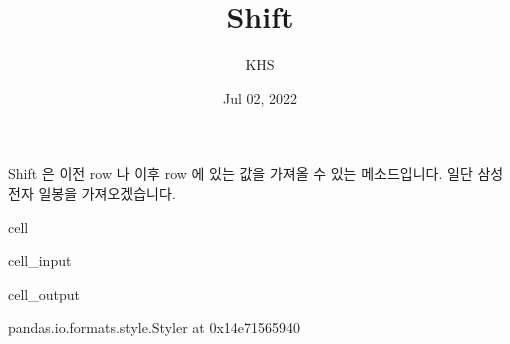 \documentclass[letterpaper,10pt,english]{jupyterBook}
\title{Shift}
\date{Jul 02, 2022}
\author{KHS}
\begin{document}
\pagestyle{empty}
\sphinxmaketitle
\pagestyle{plain}
\sphinxtableofcontents
\pagestyle{normal}
\label{\detokenize{chapter2/2.2.6_Useful_Techniques::doc}}


\sphinxAtStartPar
Shift 은 이전 row 나 이후 row 에 있는 값을 가져올 수 있는 메소드입니다. 일단 삼성전자 일봉을 가져오겠습니다.

\begin{sphinxuseclass}{cell}\begin{sphinxVerbatimInput}

\begin{sphinxuseclass}{cell_input}
\begin{sphinxVerbatim}[commandchars=\\\{\}]
    

   
     

\end{sphinxVerbatim}

\end{sphinxuseclass}\end{sphinxVerbatimInput}
\begin{sphinxVerbatimOutput}

\begin{sphinxuseclass}{cell_output}
\begin{sphinxVerbatim}[commandchars=\\\{\}]
\PYGZlt{}pandas.io.formats.style.Styler at 0x14e71565940\PYGZgt{}
\end{sphinxVerbatim}

\end{sphinxuseclass}\end{sphinxVerbatimOutput}

\end{sphinxuseclass}
\end{document}
